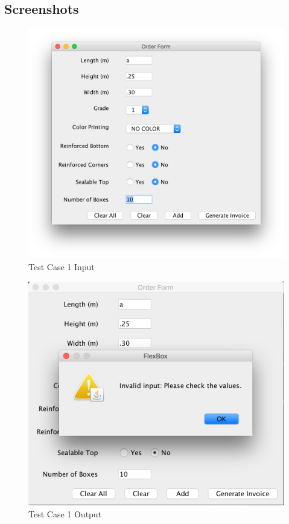\documentclass[12pt]{article}
\begin{document}
\subsection{Screenshots}
\begin{figure}[H]
\includegraphics[width=\linewidth]{./screenshots/test_case_1_input.png}
\caption{Test Case 1 Input}
\label{test_case_1_input}
\end{figure}
\begin{figure}[H]
	\includegraphics[width=\linewidth]{./screenshots/test_case_1_output.png}
	\caption{Test Case 1 Output}
	\label{test_case_1_output}
\end{figure}
\end{document}
